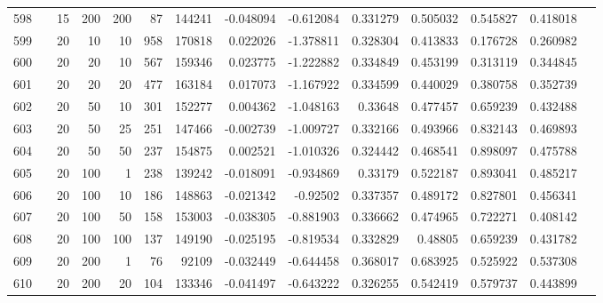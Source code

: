 \begin{longtable}{llrrrrrrrrrrrr}
		598 & &           15 &               200 &          200 &          87 &     144241 & -0.048094 & -0.612084 &  0.331279 &    0.505032 &       0.545827 &  0.418018 \\
		599 & &           20 &                10 &           10 &         958 &     170818 &  0.022026 & -1.378811 &  0.328304 &    0.413833 &       0.176728 &  0.260982 \\
		600 & &           20 &                20 &           10 &         567 &     159346 &  0.023775 & -1.222882 &  0.334849 &    0.453199 &       0.313119 &  0.344845 \\
		601 & &           20 &                20 &           20 &         477 &     163184 &  0.017073 & -1.167922 &  0.334599 &    0.440029 &       0.380758 &  0.352739 \\
		602 & &           20 &                50 &           10 &         301 &     152277 &  0.004362 & -1.048163 &   0.33648 &    0.477457 &       0.659239 &  0.432488 \\
		603 & &           20 &                50 &           25 &         251 &     147466 & -0.002739 & -1.009727 &  0.332166 &    0.493966 &       0.832143 &  0.469893 \\
		604 & &           20 &                50 &           50 &         237 &     154875 &  0.002521 & -1.010326 &  0.324442 &    0.468541 &       0.898097 &  0.475788 \\
		605 & &           20 &               100 &            1 &         238 &     139242 & -0.018091 & -0.934869 &   0.33179 &    0.522187 &       0.893041 &  0.485217 \\
		606 & &           20 &               100 &           10 &         186 &     148863 & -0.021342 &  -0.92502 &  0.337357 &    0.489172 &       0.827801 &  0.456341 \\
		607 & &           20 &               100 &           50 &         158 &     153003 & -0.038305 & -0.881903 &  0.336662 &    0.474965 &       0.722271 &  0.408142 \\
		608 & &           20 &               100 &          100 &         137 &     149190 & -0.025195 & -0.819534 &  0.332829 &     0.48805 &       0.659239 &  0.431782 \\
		609 & &           20 &               200 &            1 &          76 &      92109 & -0.032449 & -0.644458 &  0.368017 &    0.683925 &       0.525922 &  0.537308 \\
		610 & &           20 &               200 &           20 &         104 &     133346 & -0.041497 & -0.643222 &  0.326255 &    0.542419 &       0.579737 &  0.443899 \\

\end{longtable}
